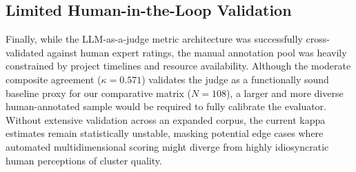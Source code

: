 \subsection{Limited Human-in-the-Loop Validation}
Finally, while the LLM-as-a-judge metric architecture was successfully cross-validated against human expert ratings, the manual annotation pool was heavily constrained by project timelines and resource availability. 
Although the moderate composite agreement ($\kappa = 0.571$) validates the judge as a functionally sound baseline proxy for our comparative matrix ($N=108$), a larger and more diverse human-annotated sample would be required to fully calibrate the evaluator. 
Without extensive validation across an expanded corpus, the current kappa estimates remain statistically unstable, masking potential edge cases where automated multidimensional scoring might diverge from highly idiosyncratic human perceptions of cluster quality.